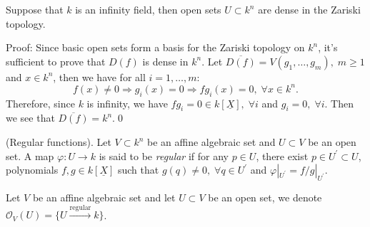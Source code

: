 \begin{dang}
    \begin{lemma}
        Suppose that $k$ is an infinity field, then open sets $U\subset k^n$ are dense in the Zariski topology.
    \end{lemma}
\end{dang}
Proof: Since basic open sets form a basis for the Zariski topology on $k^n$, it's sufficient to prove that 
$D(f)$ is dense in $k^n$. Let $\overline{D(f)}=V(g_1,\dots, g_m),\;m\geq1$ and $x\in k^n$, then we have 
for all $i=1,\dots, m$:
\begin{equation}
    f(x)\neq0\Rightarrow g_i(x) = 0\Rightarrow fg_i(x)=0,\;\forall x\in k^n.
\end{equation}
Therefore, since $k$ is infinity, we have $fg_i=0\in k[\underline{X}],\;\forall i$ and $g_i=0,\;\forall i$. Then we see that 
$\overline{D(f)}=k^n$.\qed


\begin{dang}
    \begin{definition}
    (Regular functions). Let $V\subset k^n$ be an affine algebraic set and $U\subset V$ be an open set. 
    A map $\varphi:U\to k$ is said to be \textit{regular} if for any $p\in U$, there exist $p\in U^\prime\subset U$, 
    polynomials $f,g\in k[\underline{X}]$ such that $g(q)\neq0,\;\forall q\in U^\prime$ and  
    $\varphi|_{U^\prime}=f/g|_{U^\prime}$.    
    \end{definition}
\end{dang}

\begin{dang}
    \begin{notation}
    Let $V$ be an affine algebraic set and let $U\subset V$ be an open set, we denote 
    $\mathcal{O}_V(U)=\{U\overset{\text{regular}}{\rightarrow}k\}$.
\end{notation}
\end{dang}


